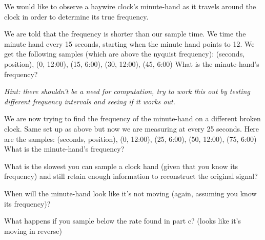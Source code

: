 


We would like to observe a haywire clock’s minute-hand as it travels around the clock in order to determine its true frequency.


\begin{enumerate}
\qitem We are told that the frequency is shorter than our sample time. We time the minute hand every 15 seconds, starting when the minute hand points to 12. We get the following samples (which are above the nyquist frequency):
(seconds, position), (0, 12:00), (15, 6:00), (30, 12:00), (45, 6:00) 
What is the minute-hand’s frequency?

\textit{Hint: there shouldn’t be a need for computation, try to work this out by testing different frequency intervals and seeing if it works out.}


\qitem We are now trying to find the frequency of the minute-hand on a different broken clock. Same set up as above but now we are measuring at every 25 seconds. Here are the samples:
(seconds, position), (0, 12:00), (25, 6:00), (50, 12:00), (75, 6:00)
What is the minute-hand’s frequency?


\qitem What is the slowest you can sample a clock hand (given that you know its frequency) and still retain enough information to reconstruct the original signal?


\qitem When will the minute-hand look like it’s not moving (again, assuming you know its frequency)?


\qitem What happens if you sample below the rate found in part c? (looks like it’s moving in reverse)


\end{enumerate}
